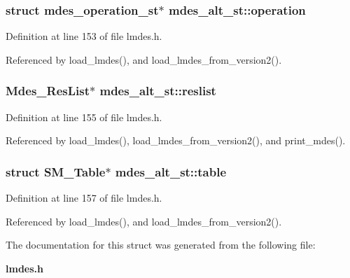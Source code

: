 \subsubsection{\setlength{\rightskip}{0pt plus 5cm}struct \bf{mdes\_\-operation\_\-st}$\ast$ \bf{mdes\_\-alt\_\-st::operation}}\label{structmdes__alt__st_d50b04c4e977de621f5202aa0fed864e}




Definition at line 153 of file lmdes.h.

Referenced by load\_\-lmdes(), and load\_\-lmdes\_\-from\_\-version2().
\subsubsection{\setlength{\rightskip}{0pt plus 5cm}\bf{Mdes\_\-Res\-List}$\ast$ \bf{mdes\_\-alt\_\-st::reslist}}\label{structmdes__alt__st_bc503b74bb015c2e83977e65e30bc7b0}




Definition at line 155 of file lmdes.h.

Referenced by load\_\-lmdes(), load\_\-lmdes\_\-from\_\-version2(), and print\_\-mdes().
\subsubsection{\setlength{\rightskip}{0pt plus 5cm}struct \bf{SM\_\-Table}$\ast$ \bf{mdes\_\-alt\_\-st::table}}\label{structmdes__alt__st_079a0a9fe66124207ace9bd7b8a1c011}




Definition at line 157 of file lmdes.h.

Referenced by load\_\-lmdes(), and load\_\-lmdes\_\-from\_\-version2().

The documentation for this struct was generated from the following file:\begin{CompactItemize}
\item 
\bf{lmdes.h}\end{CompactItemize}
